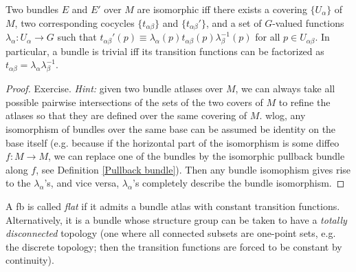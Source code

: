 \documentclass[english,letterpaper]{article}%
\numberwithin{equation}{section}
\numberwithin{figure}{section}
\numberwithin{table}{section}
\theoremstyle{definition}
\theoremstyle{definition}
\theoremstyle{definition}
\theoremstyle{plain}
\theoremstyle{plain}
\theoremstyle{plain}
\theoremstyle{plain}
\theoremstyle{remark}
\theoremstyle{remark}
\begin{document}
\begin{thm}\label{bundle isomorphism thm}
Two bundles $E$ and $E'$ over $M$ are isomorphic iff there exists a covering $\{U_\alpha \}$ of $M$, two corresponding cocycles $\{t_{\alpha\beta}\}$ and $\{t_{\alpha\beta}'\}$, and a set of $G$-valued functions $\lambda_\alpha:U_\alpha\to G$ such that $t_{\alpha\beta}'(p)\equiv \lambda_\alpha (p) t_{\alpha\beta}(p) \lambda_\beta^{-1}(p)$ for all $p\in U_{\alpha\beta}$. In particular, a bundle is trivial iff its transition functions can be factorized as $t_{\alpha\beta}=\lambda_\alpha \lambda_\beta^{-1}$.
\end{thm}
\begin{proof}
Exercise. \emph{Hint:} given two bundle atlases over $M$, we can always take all possible pairwise intersections of the sets of the two covers of $M$ to refine the atlases so that they are defined over the same covering of $M$. \gls{wlog}, any isomorphism of bundles over the same base can be assumed be identity on the base itself (e.g. because if the horizontal part of the isomorphism is some diffeo $f:M\to M$, we can replace one of the bundles by the isomorphic pullback bundle along $f$, see Definition \ref{Pullback bundle}). Then any bundle isomophism gives rise to the $\lambda_\alpha$'s, and vice versa, $\lambda_\alpha$'s completely describe the bundle isomorphism. 
\end{proof}


\begin{defn}
	A \gls{fb} is called \emph{flat} if it admits a bundle atlas with constant transition functions. Alternatively, it is a bundle whose structure group can be taken to have a \emph{totally disconnected} topology (one where all connected subsets are one-point sets, e.g. the discrete topology; then the transition functions are forced to be constant by continuity).
\end{defn}
\end{document}
